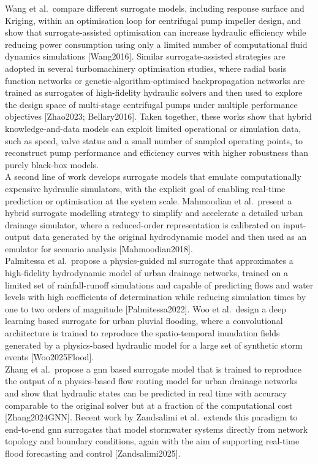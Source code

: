Wang et al.\ compare different surrogate models, including response surface and Kriging, within an optimisation loop for centrifugal pump impeller design, and show that surrogate-assisted optimisation can increase hydraulic efficiency while reducing power consumption using only a limited number of computational fluid dynamics simulations [Wang2016]. Similar surrogate-assisted strategies are adopted in several turbomachinery optimisation studies, where radial basis function networks or genetic-algorithm-optimised backpropagation networks are trained as surrogates of high-fidelity hydraulic solvers and then used to explore the design space of multi-stage centrifugal pumps under multiple performance objectives [Zhao2023; Bellary2016]. Taken together, these works show that hybrid knowledge-and-data models can exploit limited operational or simulation data, such as speed, valve status and a small number of sampled operating points, to reconstruct pump performance and efficiency curves with higher robustness than purely black-box models.\\

A second line of work develops surrogate models that emulate computationally expensive hydraulic simulators, with the explicit goal of enabling real-time prediction or optimisation at the system scale. Mahmoodian et al.\ present a hybrid surrogate modelling strategy to simplify and accelerate a detailed urban drainage simulator, where a reduced-order representation is calibrated on input-output data generated by the original hydrodynamic model and then used as an emulator for scenario analysis [Mahmoodian2018].\\

Palmitessa et al.\ propose a physics-guided \acrshort{ml} surrogate that approximates a high-fidelity hydrodynamic model of urban drainage networks, trained on a limited set of rainfall-runoff simulations and capable of predicting flows and water levels with high coefficients of determination while reducing simulation times by one to two orders of magnitude [Palmitessa2022]. Woo et al.\ design a deep learning based surrogate for urban pluvial flooding, where a convolutional architecture is trained to reproduce the spatio-temporal inundation fields generated by a physics-based hydraulic model for a large set of synthetic storm events [Woo2025Flood].\\

Zhang et al.\ propose a \acrfull{gnn} based surrogate model that is trained to reproduce the output of a physics-based flow routing model for urban drainage networks and show that hydraulic states can be predicted in real time with accuracy comparable to the original solver but at a fraction of the computational cost [Zhang2024GNN]. Recent work by Zandsalimi et al.\ extends this paradigm to end-to-end \acrshort{gnn} surrogates that model stormwater systems directly from network topology and boundary conditions, again with the aim of supporting real-time flood forecasting and control [Zandsalimi2025]. \\ 

